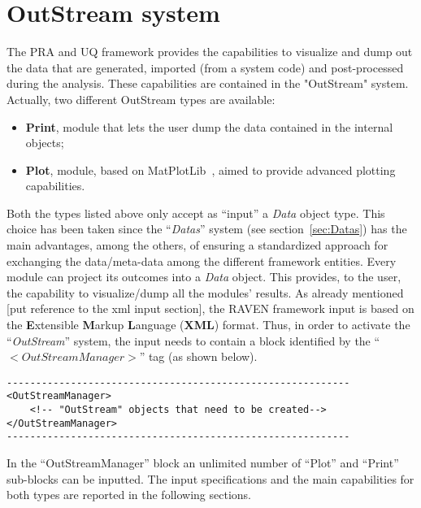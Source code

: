 \section{OutStream system \\ \vspace{2 mm} }
\label{sec:outstream}
The PRA and UQ framework provides the capabilities to visualize and dump out the data that are  generated, imported (from a system code) and post-processed during the analysis. These capabilities are contained in the "OutStream" system. Actually, two different OutStream types are available:
\vspace{-5mm}
\begin{itemize}
\itemsep0em
\item \textbf{Print}, module that lets the user dump the data contained in the internal objects;
\item \textbf{Plot}, module, based on MatPlotLib~\cite{MatPlotLib}, aimed to provide advanced plotting capabilities. 
\end{itemize}
\vspace{-5mm}
Both the types listed above only accept as ``input'' a \textit{Data} object type. This choice has been taken since the ``\textit{Datas}'' system (see section~\ref{sec:Datas}) has the main advantages, among the others, of ensuring a standardized approach for exchanging the data/meta-data among the different framework entities. Every module can project its outcomes into a \textit{Data} object. This provides, to the user, the capability to visualize/dump all the modules' results. 
As already mentioned [put reference to the xml input section], the RAVEN framework input is based on the \textbf{E}xtensible \textbf{M}arkup \textbf{L}anguage (\textbf{XML}) format. Thus, in order to activate the ``\textit{OutStream}'' system, the input needs to contain a block identified by the ``\textbf{$<OutStreamManager>$}'' tag (as shown below).  

\begin{lstlisting}[style=XML]
-----------------------------------------------------------
<OutStreamManager>
    <!-- "OutStream" objects that need to be created-->
</OutStreamManager>
-----------------------------------------------------------
\end{lstlisting}
In the ``OutStreamManager'' block an unlimited number of ``Plot'' and ``Print'' sub-blocks can be inputted. The input specifications and the main capabilities for both types are reported in the following sections.
%
%
